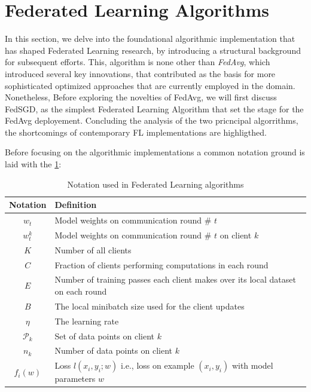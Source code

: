 \section{Federated Learning Algorithms}
In this section, we delve into the foundational algorithmic implementation that has shaped Federated Learning
research, by introducing a structural background for subsequent efforts. This, algorithm is none other than
\emph{FedAvg}, which introduced several key innovations, that contributed as the basis for more sophisticated
optimized approaches that are currently employed in the domain. Nonetheless, Before exploring the novelties of
FedAvg, we will first discuss FedSGD, as the simplest Federated Learning Algorithm that set the stage for
the FedAvg deployement. Concluding the analysis of the two pricncipal algorrithms, the shortcomings of contemporary
FL implementations are highligthed.

Before focusing on the algorithmic implementations a common notation ground is laid with the \cref{tab:fl_notation}:
\begin{table}[h!]
    \centering
    \begin{tabular}{|c|p{10cm}|}
        \hline
        \rowcolor{lightgray}
        \textbf{Notation} & \textbf{Definition}                                                                \\
        \hline
        $w_t$             & Model weights on communication round \# $t$                                        \\
        $w_t^k$           & Model weights on communication round \# $t$ on client $k$                          \\
        $K$               & Number of all clients                                                              \\

        $C$               & Fraction of clients performing computations in each round                          \\
        $E$               & Number of training passes each client makes over its local dataset on each round   \\
        $B$               & The local minibatch size used for the client updates                               \\
        $\eta$            & The learning rate                                                                  \\
        $\mathcal{P}_k$   & Set of data points on client $k$                                                   \\
        $n_k$             & Number of data points on client $k$                                                \\
        $f_i(w)$          & Loss $l(x_i, y_i; w)$ i.e., loss on example $(x_i, y_i)$ with model parameters $w$ \\
        \hline
    \end{tabular}
    \caption{Notation used in Federated Learning algorithms}
    \label{tab:fl_notation}
\end{table}

